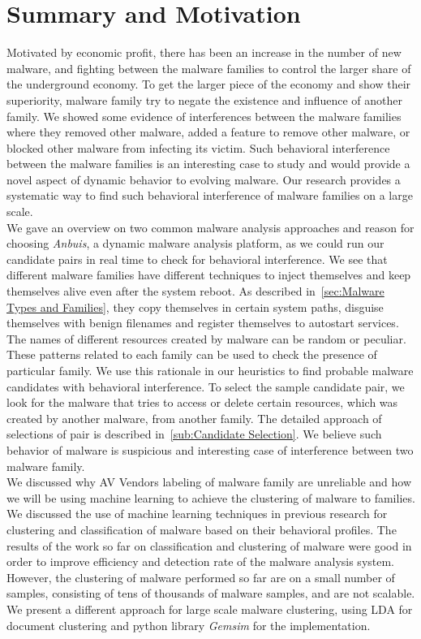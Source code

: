 \section{Summary and Motivation}
\label{sec:Motivation}
Motivated by economic profit, there has been an increase in the number of new malware, and fighting between the malware families to control the larger share of the underground economy.
To get the larger piece of the economy and show their superiority, malware family try to negate the existence and influence of another family.
We showed some evidence of interferences between the malware families where they removed other malware, added a feature to remove other malware, or blocked other malware from infecting its victim.
Such behavioral interference between the malware families is an interesting case to study and would provide a novel aspect of dynamic behavior to evolving malware.
Our research provides a systematic way to find such behavioral interference of malware families on a large scale.
\\
We gave an overview on two common malware analysis approaches and reason for choosing \emph{Anbuis}, a dynamic malware analysis platform, as we could run our candidate pairs in real time to check for behavioral interference.
We see that different malware families have different techniques to inject themselves and keep themselves alive even after the system reboot.
As described in~\autoref{sec:Malware Types and Families}, they copy themselves in certain system paths, disguise themselves with benign filenames and register themselves to autostart services.
The names of different resources created by malware can be random or peculiar.
These patterns related to each family can be used to check the presence of particular family.
We use this rationale in our heuristics to find probable malware candidates with behavioral interference.
To select the sample candidate pair, we look for the malware that tries to access or delete certain resources, which was created by another malware, from another family.
The detailed approach of selections of pair is described in~\autoref{sub:Candidate Selection}.
We believe such behavior of malware is suspicious and interesting case of interference between two malware family.\\

We discussed why AV Vendors labeling of malware family are unreliable and how we will be using machine learning to achieve the clustering of malware to families.
We discussed the use of machine learning techniques in previous research for clustering and classification of malware based on their behavioral profiles.
The results of the work so far on classification and clustering of malware were good in order to improve efficiency and detection rate of the malware analysis system.
However, the clustering of malware performed so far are on a small number of samples, consisting of tens of thousands of malware samples, and are not scalable.
We present a different approach for large scale malware clustering, using LDA for document clustering and python library \emph{Gemsim} for the implementation.\\

